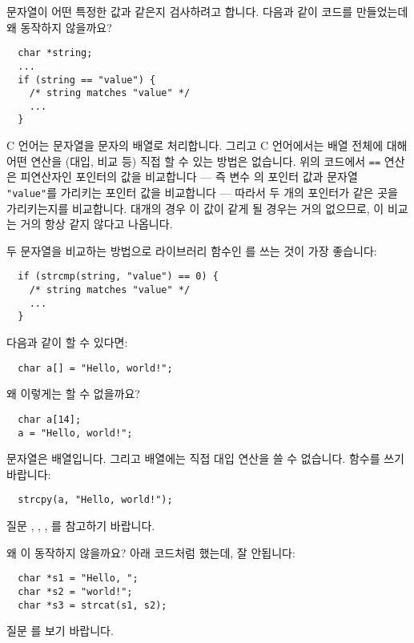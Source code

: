 \begin{faq}
	문자열이 어떤 특정한 값과 같은지 검사하려고 합니다.  다음과 같이
	코드를 만들었는데 왜 동작하지 않을까요?
\begin{verbatim}
  char *string;
  ...
  if (string == "value") {
    /* string matches "value" */
    ...
  }
\end{verbatim}
\A
	C 언어는 문자열을 문자의 배열로 처리합니다.  그리고 C 언어에서는
	배열 전체에 대해 어떤 연산을 (대입, 비교 등) 직접 할 수 있는
	방법은 없습니다.  위의 코드에서 \verb+==+ 연산은
	피연산자인 포인터의 값을 비교합니다 --- 즉 변수 의
	포인터 값과 문자열 \verb+"value"+를 가리키는 포인터 값을 
        비교합니다 ---
	따라서 두 개의 포인터가 같은 곳을 가리키는지를 비교합니다.
	대개의 경우 이 값이 같게 될 경우는 거의 없으므로, 이 비교는
	거의 항상 같지 않다고 나옵니다.

	두 문자열을 비교하는 방법으로 라이브러리 함수인 를 쓰는
	것이 가장 좋습니다:

\begin{verbatim}
  if (strcmp(string, "value") == 0) {
    /* string matches "value" */
    ...
  }
\end{verbatim}
\end{faq}

\begin{faq}
	다음과 같이 할 수 있다면:
\begin{verbatim}
  char a[] = "Hello, world!";
\end{verbatim}
	\noindent 왜 이렇게는 할 수 없을까요?
\begin{verbatim}
  char a[14];
  a = "Hello, world!";
\end{verbatim}
\A	문자열은 배열입니다.  그리고 배열에는 직접 대입 연산을 쓸 수
	없습니다.   함수를 쓰기 바랍니다:
\begin{verbatim}
  strcpy(a, "Hello, world!");
\end{verbatim}
	질문 , , , 를 참고하기 바랍니다.
\end{faq}

\begin{faq}
	왜 이 동작하지 않을까요? 아래 코드처럼 했는데, 잘
        안됩니다:
\begin{verbatim}
  char *s1 = "Hello, ";
  char *s2 = "world!";
  char *s3 = strcat(s1, s2);
\end{verbatim}
\A
	질문 를 보기 바랍니다.
\end{faq}

